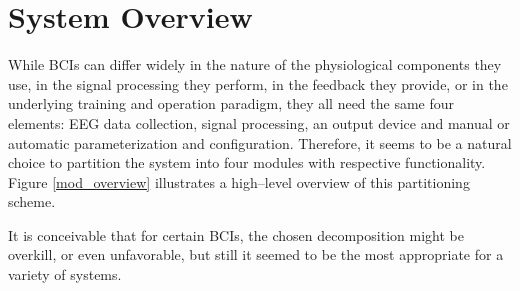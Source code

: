 \chapter{System Overview}

While BCIs can differ widely in the nature of the physiological components they 
use, in the signal processing they perform, in the feedback they provide, or in 
the underlying training and operation paradigm, they all need the same four 
elements: EEG data collection, signal processing, an output device and manual or 
automatic parameterization and configuration. Therefore, it seems to be a 
natural choice to partition the system into four modules with respective 
functionality. Figure \ref{mod_overview} illustrates a high--level overview of 
this partitioning scheme. 

It is conceivable that for certain BCIs, the chosen decomposition might be 
overkill, or even unfavorable, but still it seemed to be the most appropriate 
for a variety of systems.
